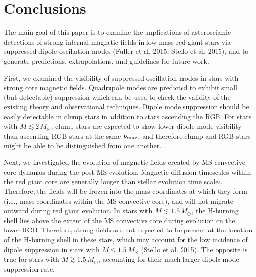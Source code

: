 \section{Conclusions}
\label{conclusion}

The main goal of this paper is to examine the implications of asteroseismic detections of strong internal magnetic fields in low-mass red giant stars via suppressed dipole oscillation modes (Fuller et al. 2015, Stello et al. 2015), and to generate predictions, extrapolations, and guidelines for future work. 

First, we examined the visibility of suppressed oscillation modes in stars with strong core magnetic fields. Quadrupole modes are predicted to exhibit small (but detectable) suppression which can be used to check the validity of the existing theory and observational techniques. Dipole mode suppression should be easily detectable in clump stars in addition to stars ascending the RGB. For stars with $M \lesssim 2 \, M_\odot$, clump stars are expected to show lower dipole mode visibility than ascending RGB stars at the same $\nu_{\rm max}$, and therefore clump and RGB stars might be able to be distinguished from one another.

Next, we investigated the evolution of magnetic fields created by MS convective core dynamos during the post-MS evolution. Magnetic diffusion timescales within the red giant core are generally longer than stellar evolution time scales. Therefore, the fields will be frozen into the mass coordinates at which they form (i.e., mass coordinates within the MS convective core), and will not migrate outward during red giant evolution. In stars with $M \lesssim 1.5 \, M_\odot$, the H-burning shell lies above the extent of the MS convective core during evolution on the lower RGB. Therefore, strong fields are not expected to be present at the location of the H-burning shell in these stars, which may account for the low incidence of dipole suppression in stars with $M \leq 1.5 \, M_\odot$ (Stello et al. 2015). The opposite is true for stars with $M \gtrsim 1.5 \, M_\odot$, accounting for their much larger dipole mode suppression rate.

